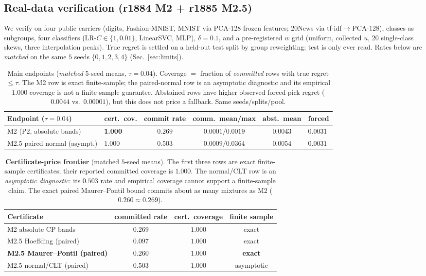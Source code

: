 \documentclass{article}
\begin{document}
\subsection{Real-data verification (r1884 M2 + r1885 M2.5)}
We verify on four public carriers (digits, Fashion-MNIST, MNIST via PCA-128 frozen features;
20News via tf-idf$\to$PCA-128), classes as subgroups, four classifiers (LR-$C{\in}\{1,0.01\}$,
LinearSVC, MLP), $\delta{=}0.1$, and a pre-registered $w$ grid (uniform, collected $u$, 20
single-class skews, three interpolation peaks). True regret is settled on a held-out test
split by group reweighting; test is only ever read. Rates below are \emph{matched} on the
same $5$ seeds $\{0,1,2,3,4\}$ (Sec.~\ref{sec:limits}).

\begin{table}[t]
\centering\small\setlength{\tabcolsep}{3pt}
\begin{tabular}{llcccl}
\toprule
Endpoint ($\tau{=}0.04$) & cert.\ cov. & commit rate &
 comm.\ mean/max & abst.\ mean & forced \\
\midrule
M2 ($\mathrm{P2}$, absolute bands) &
 \textbf{1.000} & $0.269$ &
 $0.0001/0.0019$ & $0.0043$ & $0.0031$ \\
M2.5 paired normal (asympt.) &
 $1.000$ & $0.503$ &
 $0.0009/0.0364$ & $0.0054$ & $0.0031$ \\
\bottomrule
\end{tabular}
\caption{Main endpoints (\emph{matched} $5$-seed means, $\tau{=}0.04$). Coverage $=$ fraction
of \emph{committed} rows with true regret $\le\tau$. The M2 row is exact finite-sample;
the paired-normal row is an asymptotic diagnostic and its empirical $1.000$ coverage is not a
finite-sample guarantee. Abstained rows have higher observed forced-pick regret
($0.0044$ vs.\ $0.00001$), but this does not price a fallback. Same seeds/splits/pool.}
\label{tab:main}
\end{table}

\begin{table}[t]
\centering\small
\begin{tabular}{lccc}
\toprule
Certificate & committed rate & cert.\ coverage & finite sample \\
\midrule
M2 absolute CP bands & $0.269$ & $1.000$ & exact \\
M2.5 Hoeffding (paired) & $0.097$ & $1.000$ & exact \\
\bfseries M2.5 Maurer--Pontil (paired) &
 \bfseries $0.260$ & \bfseries $1.000$ & \bfseries exact \\
M2.5 normal/CLT (paired) &
 $0.503$ & $1.000$ & asymptotic \\
\bottomrule
\end{tabular}
\caption{\textbf{Certificate-price frontier} (matched $5$-seed means). The first three rows
are exact finite-sample certificates; their reported committed coverage is $1.000$. The
normal/CLT row is an \emph{asymptotic diagnostic}: its $0.503$ rate and empirical coverage
cannot support a finite-sample claim. The exact paired Maurer--Pontil bound commits about as
many mixtures as M2 ($0.260\approx0.269$).}
\label{tab:frontier}
\end{table}
\end{document}
